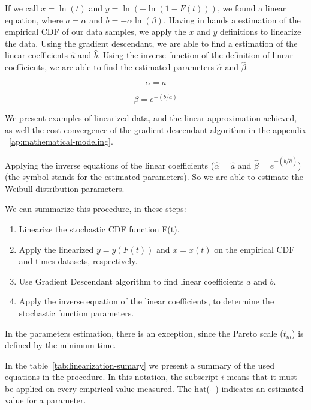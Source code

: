 If we call $x = \ln{(t)}$ and $y = \ln{(-\ln{(1 - F(t))})}$, we found a linear equation, where $a = \alpha$ and $b = -\alpha\ln{(\beta)}$. Having in hands a estimation of the empirical CDF of our data samples, we apply the $x$ and $y$ definitions to linearize the data. Using the gradient descendant, we are able to find a estimation of the linear coefficients $\hat{a}$ and $\hat{b}$. Using the inverse function of the definition of linear coefficients, we are able to find the estimated parameters $\hat{\alpha}$ and $\hat{\beta}$.

\begin{equation}
\alpha = a
\end{equation}

\begin{equation}
\beta = e^{-(b/a)}
\end{equation}

We present examples of linearized data, and the linear approximation achieved, as well the cost convergence of the gradient descendant algorithm in the appendix ~\ref{ap:mathematical-modeling}.


Applying the inverse equations of the linear coefficients ($\hat{\alpha} = \hat{a}$ and $\hat{\beta} = e^{-(\hat{b}/\hat{a})}$) (the symbol stands for the estimated parameters). So we are able to estimate the Weibull distribution parameters.

We can summarize this procedure, in these steps:
\begin{enumerate}
\item Linearize the stochastic CDF function F(t).
\item Apply the linearized $y = y(F(t))$ and  $x = x(t)$ on the empirical CDF and times datasets, respectively. 
\item Use Gradient Descendant algorithm to find linear coefficients $a$ and $b$.
\item Apply the inverse equation of the linear coefficients, to determine the stochastic function parameters.
\end{enumerate}

In the parameters estimation, there is an exception, since the Pareto scale ($t_{m}$) is defined by the minimum time. 

In the table~\ref{tab:linearization-sumary} we present a summary of the used equations in the procedure. In this notation, the subscript $i$ means that it must be applied on every empirical value measured. The hat( $\widehat{}$ ) indicates an estimated value for a parameter.

